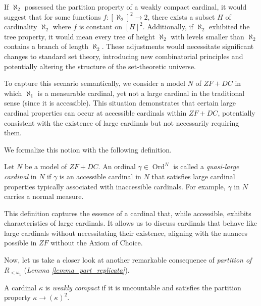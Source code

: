 If \( \aleph_2 \) possessed the partition property of a weakly compact cardinal, it would suggest that for some functions \( f: [\aleph_2]^2 \to 2 \), there exists a subset \( H \) of cardinality \( \aleph_2 \) where \( f \) is constant on \( [H]^2 \). Additionally, if \( \aleph_2 \) exhibited the tree property, it would mean every tree of height \( \aleph_2 \) with levels smaller than \( \aleph_2 \) contains a branch of length \( \aleph_2 \). These adjustments would necessitate significant changes to standard set theory, introducing new combinatorial principles and potentially altering the structure of the set-theoretic universe.

To capture this scenario semantically, we consider a model \( N \) of $ZF+DC$ in which \( \aleph_1 \) is a measurable cardinal, yet not a large cardinal in the traditional sense (since it is accessible). This situation demonstrates that certain large cardinal properties can occur at accessible cardinals within $ZF+DC$, potentially consistent with the existence of large cardinals but not necessarily requiring them.

We formalize this notion with the following definition.

\begin{definition}\label{def_quasi_large_cardinal}
  Let \( N \) be a model of $ZF+DC$. An ordinal \( \gamma \in \operatorname{Ord}^N \) is called a \emph{quasi-large cardinal} in \( N \) if \( \gamma \) is an accessible cardinal in \( N \) that satisfies large cardinal properties typically associated with inaccessible cardinals. For example, \( \gamma \) in \( N \) carries a normal measure.
\end{definition}

This definition captures the essence of a cardinal that, while accessible, exhibits characteristics of large cardinals. It allows us to discuss cardinals that behave like large cardinals without necessitating their existence, aligning with the nuances possible in $ZF$ without the Axiom of Choice.

Now, let us take a closer look at another remarkable consequence of \textit{partition of $R_{<\omega_1}$} (\textit{Lemma \ref{lemma_part_replicata}}).

\begin{definition}
  A cardinal $\kappa$ is \textit{weakly compact} if it is uncountable and satisfies the partition property $\kappa \longrightarrow (\kappa)^2$.
\end{definition}

